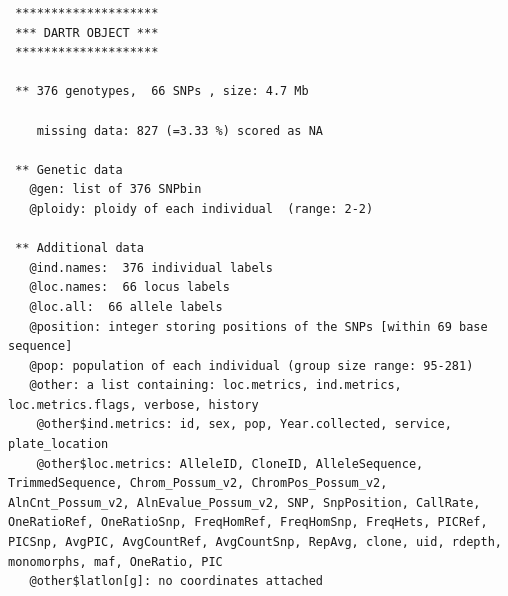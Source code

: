 \documentclass[
  letterpaper,
  DIV=11,
  numbers=noendperiod]{scrreprt}
\newenvironment{Shaded}{\begin{snugshade}}{\end{snugshade}}
\newcommand{\CommentTok}[1]{\textcolor[rgb]{0.38,0.63,0.69}{\textit{#1}}}
\newcommand{\NormalTok}[1]{\textcolor[rgb]{0.00,0.44,0.13}{#1}}
\newcommand{\SpecialCharTok}[1]{\textcolor[rgb]{0.25,0.44,0.63}{#1}}
\begin{document}
\begin{Shaded}
\end{Shaded}

\begin{verbatim}
 ********************
 *** DARTR OBJECT ***
 ********************

 ** 376 genotypes,  66 SNPs , size: 4.7 Mb

    missing data: 827 (=3.33 %) scored as NA

 ** Genetic data
   @gen: list of 376 SNPbin
   @ploidy: ploidy of each individual  (range: 2-2)

 ** Additional data
   @ind.names:  376 individual labels
   @loc.names:  66 locus labels
   @loc.all:  66 allele labels
   @position: integer storing positions of the SNPs [within 69 base sequence]
   @pop: population of each individual (group size range: 95-281)
   @other: a list containing: loc.metrics, ind.metrics, loc.metrics.flags, verbose, history 
    @other$ind.metrics: id, sex, pop, Year.collected, service, plate_location 
    @other$loc.metrics: AlleleID, CloneID, AlleleSequence, TrimmedSequence, Chrom_Possum_v2, ChromPos_Possum_v2, AlnCnt_Possum_v2, AlnEvalue_Possum_v2, SNP, SnpPosition, CallRate, OneRatioRef, OneRatioSnp, FreqHomRef, FreqHomSnp, FreqHets, PICRef, PICSnp, AvgPIC, AvgCountRef, AvgCountSnp, RepAvg, clone, uid, rdepth, monomorphs, maf, OneRatio, PIC 
   @other$latlon[g]: no coordinates attached
\end{verbatim}

\begin{Shaded}
\end{Shaded}
\end{document}
